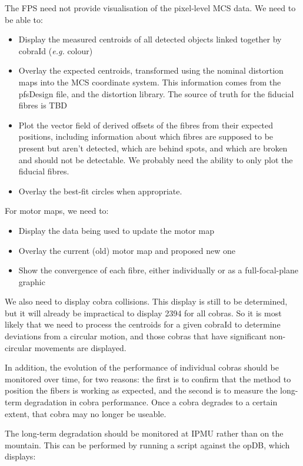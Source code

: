 \documentclass[12pt]{article}
\newcommand{\eg}{\textit{e.g.}\xspace}
\newcommand{\MCS}{\gls{MCS}\xspace}
\newcommand{\FPS}{\gls{FPS}\xspace}
\newcommand{\opDB}{\gls{opDB}\xspace}
\newcommand{\TBD}{\gls{TBD}\xspace}
\begin{document}
The \FPS need not provide visualisation of the pixel-level \MCS data.
We need to be able to:
\begin{itemize}
\item Display the measured centroids of all detected objects linked together by cobraId (\eg colour)  
\item Overlay the expected centroids, transformed using the nominal distortion maps
  into the \MCS coordinate system.
  This information comes from the \gls{pfsDesign} file, and the distortion library. The
  source of truth for the fiducial fibres is \TBD
\item Plot the vector field of derived offsets of the fibres from their expected positions,
  including information about which fibres are supposed to be present but aren't detected,
  which are behind spots, and which are broken and should not be detectable.
  We probably need the ability to only plot the fiducial fibres.
\item
  Overlay the best-fit circles when appropriate.
\end{itemize}

For motor maps, we need to:

\begin{itemize}
\item Display the data being used to update the \gls{motor map}
\item Overlay the current (old) \gls{motor map} and proposed new one
\item Show the convergence of each fibre, either individually or as a full-focal-plane graphic
\end{itemize}

We also need to display cobra collisions. This display is still to be determined, but it will already be impractical
to display 2394 for all cobras. So it is most likely that we need to process the centroids for a given cobraId 
to determine deviations from a circular motion, and those cobras that have significant non-circular movements
are displayed.


In addition, the evolution of the performance of individual cobras should be monitored over time, for two reasons:
the first is to confirm that the method to position the fibers is working as expected, and the second is to measure
the long-term degradation in cobra performance. Once a cobra degrades to a certain extent, that cobra may no longer be useable. 


The long-term degradation should be monitored at IPMU rather than on the mountain.
This can be performed by running a script against the \opDB, 
which displays:
\end{document}
